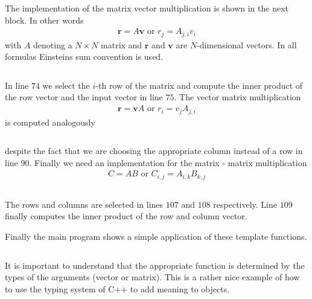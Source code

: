 The implementation of the matrix vector multiplication is shown in the next
block. In other words
\begin{align}
 \mathbf{r} = A\mathbf{v} \mbox{ or } r_j = A_{j,i}v_i
\end{align}
with $A$ denoting a $N\times N$ matrix and $\mathbf{r}$ and $\mathbf{v}$ are
$N$-dimensional vectors. In all formulas Einsteins sum convention is used.
\inputminted[fontsize=\small,
             linenos,
             firstline=64,
             lastline=80,
             firstnumber=64,
             frame=lines,
             label=examples/array\_arithmetic3.cpp]
{cpp}{../examples/array_arithmetic3.cpp}
In line $74$ we select the $i$-th row of the matrix and compute the inner
product of the row vector and the input vector in line $75$. 
The vector matrix multiplication
\begin{align}
 \mathbf{r} = \mathbf{v}A\mbox{ or } r_i = v_j A_{j,i}
\end{align}
is computed analogously 
\inputminted[fontsize=\small,
             linenos,
             firstline=80,
             lastline=95,
             firstnumber=80,
             frame=lines,
             label=examples/array\_arithmetic3.cpp]
{cpp}{../examples/array_arithmetic3.cpp}
despite the fact that we are choosing the appropriate column instead of a row in 
line $90$. Finally we need an implementation for the matrix - matrix
multiplication
\begin{align}
C = AB \mbox{ or } C_{i,j} = A_{i,k}B_{k,j}
\end{align}
\inputminted[fontsize=\small,
             linenos,
             firstline=96,
             lastline=115,
             firstnumber=96,
             frame=lines,
             label=examples/array\_arithmetics3.cpp]
{cpp}{../examples/array_arithmetic3.cpp}
The rows and columns are selected in lines $107$ and $108$ respectively. 
Line $109$ finally computes the inner product of the row and column vector.

Finally the main program shows a simple application of these template functions. 
\inputminted[fontsize=\small,
             linenos,
             firstline=116,
             lastline=138,
             firstnumber=116,
             frame=lines,
             label=examples/array\_arithemtic3.cpp]
{cpp}{../examples/array_arithmetic3.cpp}
It is important to understand that the appropriate function is determined by the
types of the arguments (vector or matrix). This is a rather nice example of how
to use the typing system of C++ to add meaning to objects.

